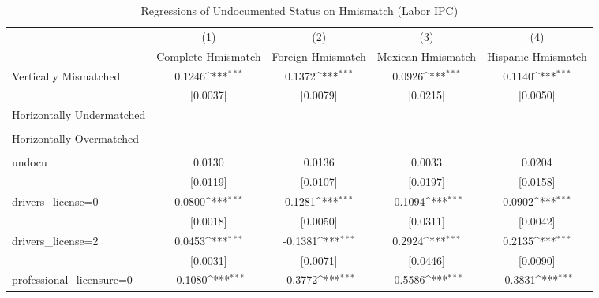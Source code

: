 \begin{table}[htbp]\centering
\def\sym#1{\ifmmode^{#1}\else\(^{#1}\)\fi}
\caption{Regressions of Undocumented Status on Hmismatch (Labor IPC)}
\begin{tabular}{l*{4}{c}}
\toprule
                    &\multicolumn{1}{c}{(1)}         &\multicolumn{1}{c}{(2)}         &\multicolumn{1}{c}{(3)}         &\multicolumn{1}{c}{(4)}         \\
                    &Complete Hmismatch         &Foreign Hmismatch         &Mexican Hmismatch         &Hispanic Hmismatch         \\
\midrule
Vertically Mismatched&      0.1246\sym{***}&      0.1372\sym{***}&      0.0926\sym{***}&      0.1140\sym{***}\\
                    &    [0.0037]         &    [0.0079]         &    [0.0215]         &    [0.0050]         \\
\addlinespace
Horizontally Undermatched&                     &                     &                     &                     \\
                    &                     &                     &                     &                     \\
\addlinespace
Horizontally Overmatched&                     &                     &                     &                     \\
                    &                     &                     &                     &                     \\
\addlinespace
undocu              &      0.0130         &      0.0136         &      0.0033         &      0.0204         \\
                    &    [0.0119]         &    [0.0107]         &    [0.0197]         &    [0.0158]         \\
\addlinespace
drivers\_license=0   &      0.0800\sym{***}&      0.1281\sym{***}&     -0.1094\sym{***}&      0.0902\sym{***}\\
                    &    [0.0018]         &    [0.0050]         &    [0.0311]         &    [0.0042]         \\
\addlinespace
drivers\_license=2   &      0.0453\sym{***}&     -0.1381\sym{***}&      0.2924\sym{***}&      0.2135\sym{***}\\
                    &    [0.0031]         &    [0.0071]         &    [0.0446]         &    [0.0090]         \\
\addlinespace
professional\_licensure=0&     -0.1080\sym{***}&     -0.3772\sym{***}&     -0.5586\sym{***}&     -0.3831\sym{***}\\

\end{tabular}
\end{table}
